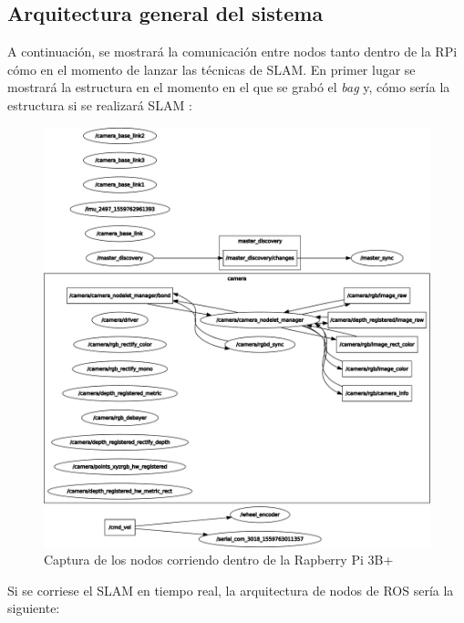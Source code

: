\subsection{Arquitectura general del sistema}
A continuación, se mostrará la comunicación entre nodos tanto dentro de la RPi cómo en el momento de lanzar las técnicas de SLAM. En primer lugar se mostrará la estructura en el momento en el que se grabó
el \textit{bag} y, cómo sería la estructura si se realizará SLAM :
\begin{figure}[!ht]
    \centering
    \includegraphics[width=.8\textwidth]{images/rqt_graphs/rpi_onboardBAG.pdf}
    \caption{Captura de los nodos corriendo dentro de la Rapberry Pi 3B+}
    \label{rqt01}
\end{figure}

\newpage
Si se corriese el SLAM en tiempo real, la arquitectura de nodos de ROS sería la siguiente:

